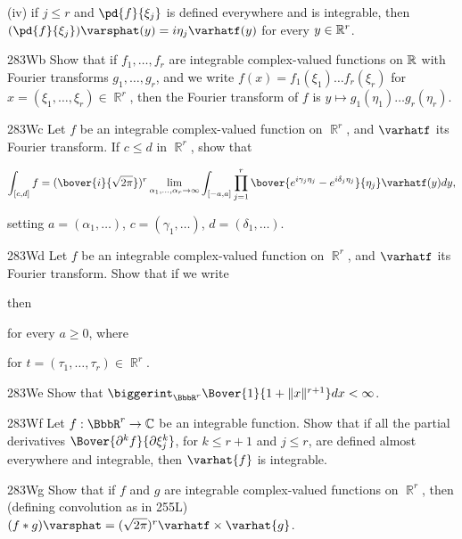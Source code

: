 {\quad (iv) if $j\le r$ and $\pd{f}{\xi_j}$ is defined everywhere and is
integrable, then
$(\pd{f}{\xi_j})\varsphat(y)=i\eta_j\varhatf(y)$
for every $y\in\Bbb R^r$.   

\spheader 283Wb Show that if $f_1,\ldots,f_r$ are integrable
complex-valued functions on $\Bbb R$ with Fourier transforms
$g_1,\ldots,g_r$, and we write $f(x)=f_1(\xi_1)\ldots f_r(\xi_r)$ for
$x=(\xi_1,\ldots,\xi_r)\in\BbbR^r$, then the Fourier transform of $f$
is $y\mapsto g_1(\eta_1)\ldots g_r(\eta_r)$.

\spheader 283Wc Let $f$ be an integrable complex-valued function
on $\BbbR^r$, and $\varhatf$ its Fourier transform.   If $c\le d$ in
$\BbbR^r$, show that

$$\int_{[c,d]}f
=(\bover{i}{\sqrt{2\pi}})^r
\lim_{\alpha_1,\ldots,\alpha_r\to\infty}
\int_{[-a,a]}\prod_{j=1}^r
\bover{e^{i\gamma_j\eta_j}-e^{i\delta_j\eta_j}}{\eta_j}\varhatf(y)dy,$$

\noindent setting $a=(\alpha_1,\ldots)$, $c=(\gamma_1,\ldots)$,
$d=(\delta_1,\ldots)$.

\spheader 283Wd
Let $f$ be an integrable complex-valued function on $\BbbR^r$, and
$\varhatf$ its Fourier transform.   Show that if we write


\noindent then


\noindent for every $a\ge 0$, where


\noindent for $t=(\tau_1,\ldots,\tau_r)\in\BbbR^r$.

\spheader 283We Show that
$\biggerint_{\BbbR^r}\Bover{1}{1+\|x\|^{r+1}}dx<\infty$.

\spheader 283Wf Let $f:\BbbR^r\to\Bbb C$ be an integrable function.
Show that if all the partial derivatives
$\Bover{\partial^kf}{\partial\xi_j^k}$, for $k\le r+1$ and
$j\le r$, are defined almost everywhere and integrable,
then $\varhat{f}$ is integrable.

\spheader 283Wg
Show that if $f$ and $g$ are integrable
complex-valued functions on $\BbbR^r$, then (defining convolution as in
255L) $(f*g)\varsphat=(\sqrt{2\pi})^r\varhatf\times\varhat{g}$.

}
